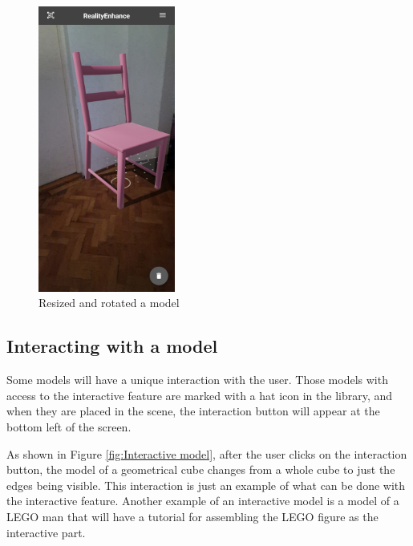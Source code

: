 \begin{figure}[ht]
    \begin{center}
        \includegraphics[width=0.4\textwidth]{img/App_screenshots/Size-rotation.jpg}
        \caption{Resized and rotated a model}
        \label{fig:Rezise and rotate a model}
    \end{center}
\end{figure}
\pagebreak

\subsection{Interacting with a model}
Some models will have a unique interaction with the user. Those models with access to the interactive feature are marked with a hat icon in the library, and when they are placed in the scene, the interaction button will appear at the bottom left of the screen.

As shown in Figure \ref{fig:Interactive model}, after the user clicks on the interaction button, the model of a geometrical cube changes from a whole cube to just the edges being visible. This interaction is just an example of what can be done with the interactive feature. Another example of an interactive model is a model of a LEGO man that will have a tutorial for assembling the LEGO figure as the interactive part.

